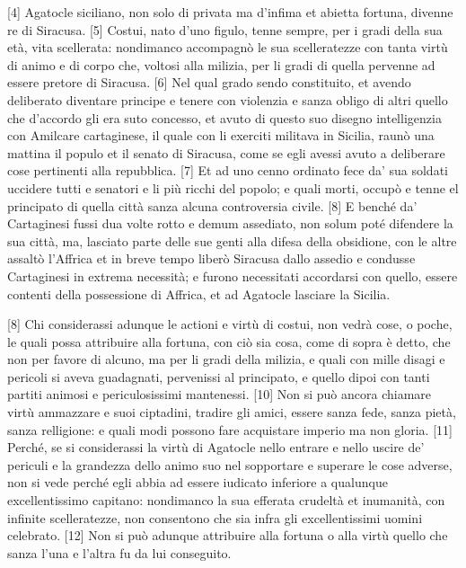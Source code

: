 {[}4{]} Agatocle siciliano, non solo di privata ma d'infima et abietta
fortuna, divenne re di Siracusa. {[}5{]} Costui, nato d'uno figulo,
tenne sempre, per i gradi della sua età, vita scellerata: nondimanco
accompagnò le sua scelleratezze con tanta virtù di animo e di corpo che,
voltosi alla milizia, per li gradi di quella pervenne ad essere pretore
di Siracusa. {[}6{]} Nel qual grado sendo constituito, et avendo
deliberato diventare principe e tenere con violenzia e sanza obligo di
altri quello che d'accordo gli era suto concesso, et avuto di questo suo
disegno intelligenzia con Amilcare cartaginese, il quale con li exerciti
militava in Sicilia, raunò una mattina il populo et il senato di
Siracusa, come se egli avessi avuto a deliberare cose pertinenti alla
repubblica. {[}7{]} Et ad uno cenno ordinato fece da' sua soldati
uccidere tutti e senatori e li più ricchi del popolo; e quali morti,
occupò e tenne el principato di quella città sanza alcuna controversia
civile. {[}8{]} E benché da' Cartaginesi fussi dua volte rotto e demum
assediato, non solum poté difendere la sua città, ma, lasciato parte
delle sue genti alla difesa della obsidione, con le altre assaltò
l'Affrica et in breve tempo liberò Siracusa dallo assedio e condusse
Cartaginesi in extrema necessità; e furono necessitati accordarsi con
quello, essere contenti della possessione di Affrica, et ad Agatocle
lasciare la Sicilia.

{[}8{]} Chi considerassi adunque le actioni e virtù di costui, non vedrà
cose, o poche, le quali possa attribuire alla fortuna, con ciò sia cosa,
come di sopra è detto, che non per favore di alcuno, ma per li gradi
della milizia, e quali con mille disagi e pericoli si aveva guadagnati,
pervenissi al principato, e quello dipoi con tanti partiti animosi e
periculosissimi mantenessi. {[}10{]} Non si può ancora chiamare virtù
ammazzare e suoi ciptadini, tradire gli amici, essere sanza fede, sanza
pietà, sanza relligione: e quali modi possono fare acquistare imperio ma
non gloria. {[}11{]} Perché, se si considerassi la virtù di Agatocle
nello entrare e nello uscire de' periculi e la grandezza dello animo suo
nel sopportare e superare le cose adverse, non si vede perché egli abbia
ad essere iudicato inferiore a qualunque excellentissimo capitano:
nondimanco la sua efferata crudeltà et inumanità, con infinite
scelleratezze, non consentono che sia infra gli excellentissimi uomini
celebrato. {[}12{]} Non si può adunque attribuire alla fortuna o alla
virtù quello che sanza l'una e l'altra fu da lui conseguito.

